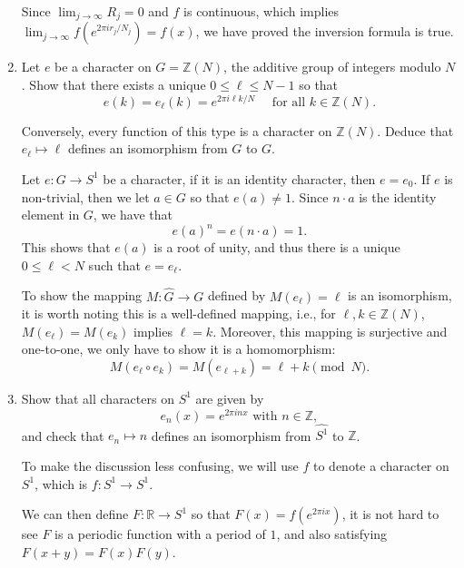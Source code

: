 \documentclass{article}
\begin{document}
\begin{enumerate}
\begin{solution}
        Since $\lim_{j\to\infty}  R_j=0$ and $f$ is continuous, which implies $\lim_{j\to\infty} f(e^{2\pi ir_j/N_j})=f(x)$, we have proved the inversion
        formula is true.
    \end{solution}

    \item Let $e$ be a character on $G=\mathbb Z(N)$, the additive group of integers modulo $N$. Show that there exists a unique
    $0\leq \ell\leq N-1$ so that 
    $$e(k) = e_\ell(k) = e^{2\pi i\ell k/N}\quad\text{ for all } k\in\mathbb Z(N).$$

    Conversely, every function of this type is a character on $\mathbb Z(N)$. Deduce that $e_\ell\mapsto \ell$ defines an
    isomorphism from $G$ to $G$.

    \begin{solution}
        Let $e: G\to S^1$ be a character, if it is an identity character, then $e=e_0$.
        If $e$ is non-trivial, then we let $a\in G$ so that $e(a)\neq 1$.
        Since $n\cdot a$ is the identity element in $G$, we have that 
        $$e(a)^n = e(n\cdot a) = 1.$$
        This shows that $e(a)$ is a root of unity, and thus there is a unique $0\leq \ell< N$ such that $e=e_\ell$.

        To show the mapping $M: \hat G \to G$ defined by $M(e_\ell) = \ell$ is an isomorphism, it is worth noting this is a
        well-defined mapping, i.e., for $\ell, k\in \mathbb Z(N)$, $M(e_\ell)=M(e_k)$ implies $\ell=k$.
        Moreover, this mapping is surjective and one-to-one, we only have to show it is a homomorphism:
        $$M(e_\ell \circ e_k) = M(e_{\ell+k}) = \ell+k\pmod N.$$
    \end{solution}

    \item Show that all characters on $S^1$ are given by 
    $$e_n(x) = e^{2\pi inx}\text{ with }n\in \mathbb Z,$$
    and check that $e_n\mapsto n$ defines an isomorphism from $\widehat{S^1}$ to $\mathbb Z$. 

    \begin{solution}
        To make the discussion less confusing, we will use $f$ to denote a character on $S^1$, which is $f: S^1\to S^1$.

        We can then define $F: \mathbb R\to S^1$ so that $F(x) = f(e^{2\pi ix})$, it is not hard to see $F$ is a periodic function
        with a period of $1$, and also satisfying $F(x+y) = F(x)F(y)$.


\end{solution}
\end{enumerate}
\end{document}
